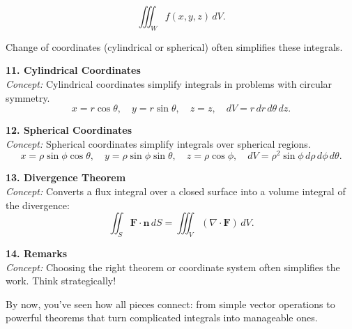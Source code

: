 \documentclass[9pt]{article}
\begin{document}
\begin{multicols}{2}
\begin{tcolorbox}[title=, colframe=brightgreen]
\[
\iiint_W f(x,y,z)\,dV.
\]

Change of coordinates (cylindrical or spherical) often simplifies these integrals.
\end{tcolorbox}

\begin{tcolorbox}[title=, colframe=brightpink]
\textbf{11. Cylindrical Coordinates}\\
\textit{Concept:} Cylindrical coordinates simplify integrals in problems with circular symmetry.
\[
x=r\cos\theta,\quad y=r\sin\theta,\quad z=z,\quad dV=r\,dr\,d\theta\,dz.
\]
\end{tcolorbox}

\begin{tcolorbox}[title=, colframe=brightyellow]
\textbf{12. Spherical Coordinates}\\
\textit{Concept:} Spherical coordinates simplify integrals over spherical regions.
\[
x=\rho\sin\phi\cos\theta,\quad y=\rho\sin\phi\sin\theta,\quad z=\rho\cos\phi,\quad dV=\rho^2\sin\phi\,d\rho\,d\phi\,d\theta.
\]
\end{tcolorbox}

\begin{tcolorbox}[title=, colframe=brightblue]
\textbf{13. Divergence Theorem}\\
\textit{Concept:} Converts a flux integral over a closed surface into a volume integral of the divergence:
\[
\iint_{S}\mathbf{F}\cdot\mathbf{n}\,dS=\iiint_{V}(\nabla \cdot \mathbf{F})\,dV.
\]
\end{tcolorbox}

\begin{tcolorbox}[title=, colframe=brightgreen]
\textbf{14. Remarks}\\
\textit{Concept:} Choosing the right theorem or coordinate system often simplifies the work. Think strategically!
\end{tcolorbox}

\end{multicols}

\noindent By now, you've seen how all pieces connect: from simple vector operations to powerful theorems that turn complicated integrals into manageable ones.
\end{document}
